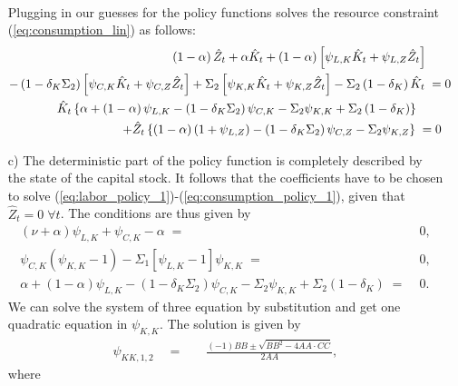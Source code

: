 \documentclass[a4paper, 12pt]{article}
\begin{document}
\begin{Answer}
\begin{small}
\begin{enumerate}
\begin{align}
				\end{align}%
				Plugging in our guesses for the policy functions solves the resource constraint (\ref{eq:consumption_lin}) as follows:%
				\begin{align}%
					\left(1-\alpha\right) \hat{Z}_t + \alpha \hat{K}_t + \left(1-\alpha\right) \left[\psi_{L,K} \hat{K}_t + \psi_{L,Z} \hat{Z}_t\right] \; \quad\notag\\%
					- \left(1-\delta_K \Sigma_2\right) \left[\psi_{C,K}\hat{K}_t + \psi_{C,Z}\hat{Z}_t\right] + \Sigma_2 \left[ \psi_{K,K}\hat{K}_t + \psi_{K,Z}\hat{Z}_t \right] - \Sigma_2 \left(1-\delta_K\right) \hat{K}_t \; = & \; 0\notag\\%
					\begin{split}%
						\hat{K}_t \left\{ \alpha + \left(1-\alpha\right) \psi_{L,K} - \left(1-\delta_K \Sigma_2\right) \psi_{C,K} - \Sigma_2 \psi_{K,K} + \Sigma_2 \left(1-\delta_K\right) \right\} \; \quad &\\%
						+ \hat{Z}_t \left\{ \left(1-\alpha\right)\left(1+\psi_{L,Z}\right) - \left(1-\delta_K \Sigma_2\right) \psi_{C,Z} - \Sigma_2 \psi_{K,Z} \right\} \; = & \; 0%
					\end{split}\label{eq:consumption_policy_1}%
				\end{align}%
			\item[c) ] The deterministic part of the policy function is completely described by the state of the capital stock. It follows that the coefficients have to be chosen to solve (\ref{eq:labor_policy_1})-(\ref{eq:consumption_policy_1}), given that $\hat{Z}_t = 0 \; \forall t$. The conditions are thus given by%
				\begin{align}%
					\left(\nu+\alpha\right) \psi_{L,K} + \psi_{C,K} - \alpha \; = & \; 0,\\%
					\psi_{C,K} \left(\psi_{K,K}-1\right) - \Sigma_1 \left[\psi_{L,K}-1\right] \psi_{K,K} \; = & \; 0,\\%
					\alpha + \left(1-\alpha\right) \psi_{L,K} - \left(1-\delta_K \Sigma_2\right) \psi_{C,K} - \Sigma_2 \psi_{K,K} + \Sigma_2 \left(1-\delta_K\right) \; = & \; 0.%
				\end{align}%
				We can solve the system of three equation by substitution and get one quadratic equation in $\psi_{K,K}$. The solution is given by%
				\begin{align}%
					\psi_{KK,1,2} \quad = & \quad \frac{\left(-1\right)BB \pm \sqrt{BB^2 - 4 AA \cdot CC}}{2 AA},%
				  \end{align}%
				  where%
				  \begin{align*}%

\end{align*}
\end{enumerate}
\end{small}
\end{Answer}
\end{document}
